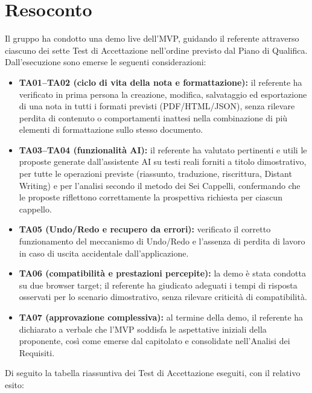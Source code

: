 \section{Resoconto}

Il gruppo ha condotto una demo live dell'MVP, guidando il referente attraverso ciascuno dei sette Test di Accettazione nell'ordine previsto dal Piano di Qualifica. Dall'esecuzione sono emerse le seguenti considerazioni:

\begin{itemize}
	\item \textbf{TA01--TA02 (ciclo di vita della nota e formattazione):} il referente ha verificato in prima persona la creazione, modifica, salvataggio ed esportazione di una nota in tutti i formati previsti (PDF/HTML/JSON), senza rilevare perdita di contenuto o comportamenti inattesi nella combinazione di più elementi di formattazione sullo stesso documento.

	\item \textbf{TA03--TA04 (funzionalità AI):} il referente ha valutato pertinenti e utili le proposte generate dall'assistente AI su testi reali forniti a titolo dimostrativo, per tutte le operazioni previste (riassunto, traduzione, riscrittura, Distant Writing) e per l'analisi secondo il metodo dei Sei Cappelli, confermando che le proposte riflettono correttamente la prospettiva richiesta per ciascun cappello.

	\item \textbf{TA05 (Undo/Redo e recupero da errori):} verificato il corretto funzionamento del meccanismo di Undo/Redo e l'assenza di perdita di lavoro in caso di uscita accidentale dall'applicazione.

	\item \textbf{TA06 (compatibilità e prestazioni percepite):} la demo è stata condotta su due browser target; il referente ha giudicato adeguati i tempi di risposta osservati per lo scenario dimostrativo, senza rilevare criticità di compatibilità.

	\item \textbf{TA07 (approvazione complessiva):} al termine della demo, il referente ha dichiarato a verbale che l'MVP soddisfa le aspettative iniziali della proponente, così come emerse dal capitolato e consolidate nell'Analisi dei Requisiti.
\end{itemize}

Di seguito la tabella riassuntiva dei Test di Accettazione eseguiti, con il relativo esito:

